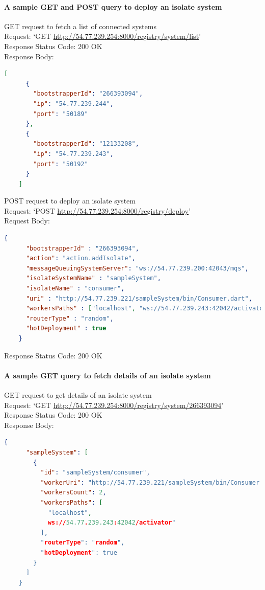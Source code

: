 \paragraph{A sample GET and POST query to deploy an isolate system}
\begin{description}
  \item{GET request to fetch a list of connected systems}\\
  Request: ‘GET \url{http://54.77.239.254:8000/registry/system/list}’\\
  Response Status Code: 200 OK\\
  Response Body:
  \begin{lstlisting}[language=json,firstnumber=1]
    [
      {
        "bootstrapperId": "266393094",
        "ip": "54.77.239.244",
        "port": "50189"
      },
      {
        "bootstrapperId": "12133208",
        "ip": "54.77.239.243",
        "port": "50192"
      }
    ]
  \end{lstlisting}

  \item{POST request to deploy an isolate system}\\
  Request: ‘POST \url{http://54.77.239.254:8000/registry/deploy}’\\
  Request Body:
  \begin{lstlisting}[language=json,firstnumber=1]
    {
      "bootstrapperId" : "266393094",
      "action": "action.addIsolate",
      "messageQueuingSystemServer": "ws://54.77.239.200:42043/mqs",
      "isolateSystemName" : "sampleSystem",
      "isolateName" : "consumer",
      "uri" : "http://54.77.239.221/sampleSystem/bin/Consumer.dart",
      "workersPaths" : ["localhost", "ws://54.77.239.243:42042/activator"],
      "routerType" : "random",
      "hotDeployment" : true
    }
  \end{lstlisting}
  Response Status Code: 200 OK
\end{description}

\paragraph{A sample GET query to fetch details of an isolate system}
  \begin{description}
    \item{GET request to get details of an isolate system}\\
    Request: ‘GET \url{http://54.77.239.254:8000/registry/system/266393094}’\\
    Response Status Code: 200 OK\\
    Response Body:
    \begin{lstlisting}[language=json,firstnumber=1]
    {
      "sampleSystem": [
        {
          "id": "sampleSystem/consumer",
          "workerUri": "http://54.77.239.221/sampleSystem/bin/Consumer.dart",
          "workersCount": 2,
          "workersPaths": [
            "localhost",
            ws://54.77.239.243:42042/activator"
          ],
          "routerType": "random",
          "hotDeployment": true
        }
      ]
    }
  \end{lstlisting}
  \end{description}

